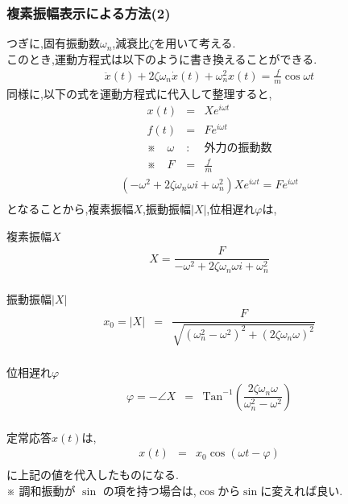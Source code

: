 \documentclass[a4paper]{jsarticle}
\begin{document}
\subsubsection{複素振幅表示による方法(2)}
つぎに,固有振動数$\omega_n$,減衰比$\zeta$を用いて考える.\\
このとき,運動方程式は以下のように書き換えることができる.
\begin{eqnarray*}
    \ddot{x}\left(t\right)+2\zeta\omega_n\dot{x}\left(t\right)+\omega_n^2 x\left(t\right)=\frac{f}{m}\cos\omega t
\end{eqnarray*}
同様に,以下の式を運動方程式に代入して整理すると,
\begin{eqnarray*}
    x\left(t\right)&=&Xe^{i\omega t}\\
    f\left(t\right)&=&Fe^{i\omega t}\\
    ※\quad\omega &:& 外力の振動数\\
    ※\quad F &=& \frac{f}{m}
\end{eqnarray*}
\begin{eqnarray*}
    \left(-\omega^2+2\zeta\omega_n\omega i+\omega_n^2\right)Xe^{i\omega t}=Fe^{i\omega t}\\
\end{eqnarray*}
となることから,複素振幅$X$,振動振幅$|X|$,位相遅れ$\varphi$は,
\begin{itembox}[l]{複素振幅$X$}
    \begin{eqnarray*}
        X=\dfrac{F}{-\omega^2+2\zeta\omega_n\omega i+\omega_n^2}\\
    \end{eqnarray*}
\end{itembox}
\begin{itembox}[l]{振動振幅$|X|$}
    \begin{eqnarray*}
        x_0=|X|&=&\dfrac{F}{\sqrt{\left(\omega_n^2-\omega^2\right)^2+\left(2\zeta\omega_n\omega\right)^2}}\\
    \end{eqnarray*}
\end{itembox}
\begin{itembox}[l]{位相遅れ$\varphi$}
    \begin{eqnarray*}
        \varphi=-\angle X &=&\mathrm{Tan}^{-1}\left(\dfrac{2\zeta\omega_n\omega}{\omega_n^2-\omega^2}\right)\\
    \end{eqnarray*}
\end{itembox}
定常応答$x\left(t\right)$は,
\begin{eqnarray*}
    x\left(t\right)&=&x_0\cos\left(\omega t-\varphi\right)\\
\end{eqnarray*}
に上記の値を代入したものになる.\\
※ 調和振動が $\sin$ の項を持つ場合は,$\cos$から$\sin$に変えれば良い.
\end{document}
